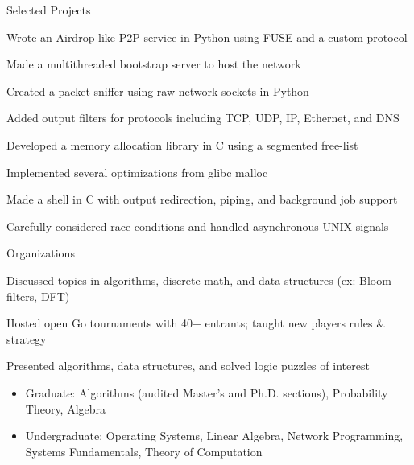 \documentclass{cv}
\begin{document}
\begin{cvsection}{Selected Projects}
  {
    \item Wrote an Airdrop-like P2P service in Python using FUSE and a custom protocol
    \item Made a multithreaded bootstrap server to host the network
  }
  {
    \item Created a packet sniffer using raw network sockets in Python
    \item Added output filters for protocols including TCP, UDP, IP, Ethernet, and DNS
  }
  {
    \item Developed a memory allocation library in C using a segmented free-list
    \item Implemented several optimizations from glibc malloc
  }
  {
    \item Made a shell in C with output redirection, piping, and background job support
    \item Carefully considered race conditions and handled asynchronous UNIX signals
  }
\end{cvsection}

\begin{cvsection}{Organizations}
  {
    \item Discussed topics in algorithms, discrete math, and data structures (ex: Bloom filters, DFT)
  }
  {
    \item Hosted open Go tournaments with 40+ entrants; taught new players rules \& strategy
  }
  {
    \item Presented algorithms, data structures, and solved logic puzzles of interest
  }
\end{cvsection}

\begin{minipage}{\textwidth}
  \begin{itemize}[noitemsep,topsep=0pt]%
    \item Graduate: Algorithms (audited Master's and Ph.D. sections), Probability Theory, Algebra
    \item Undergraduate: Operating Systems, Linear Algebra, Network Programming, Systems Fundamentals, Theory of Computation
  \end{itemize}%
\end{minipage}%
\end{document}
